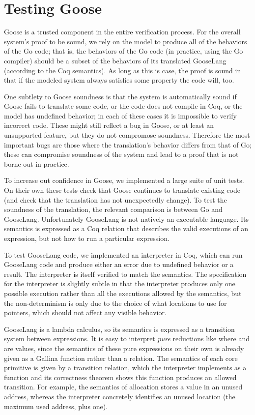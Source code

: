 \section{Testing Goose}
\label{sec:goose:testing}

Goose is a trusted component in the entire verification process. For the
overall system's proof to be sound, we rely on the model to produce all
of the behaviors of the Go code; that is, the behaviors of the Go code
(in practice, using the Go compiler) should be a subset of the behaviors
of its translated GooseLang (according to the Coq semantics). As long as
this is case, the proof is sound in that if the modeled system always
satisfies some property the code will, too.

One subtlety to Goose soundness is that the system is automatically sound if
Goose fails to translate some code, or the code does not compile in Coq, or the
model has undefined behavior; in each of these cases it is impossible to verify
incorrect code. These might still reflect a bug in Goose, or at least an
unsupported feature, but they do not compromose soundness. Therefore the
most important bugs are those where the translation's behavior differs
from that of Go; these can compromise soundness of the system and lead
to a proof that is not borne out in practice.

To increase out confidence in Goose, we implemented a large suite of
unit tests. On their own these tests check that Goose continues to translate
existing code (and check that the translation has not unexpectedly
change). To test the soundness of the translation, the relevant comparison is
between Go and GooseLang. Unfortunately GooseLang is not natively an executable language.
Its semantics is expressed as a Coq relation that describes the valid executions
of an expression, but not how to run a particular expression.

To test GooseLang code, we implemented an interpreter in Coq, which can
run GooseLang code and produce either an error due to undefined behavior
or a result. The interpreter is itself
verified to match the semantics. The specification for the interpreter is slightly
subtle in that the interpreter produces only one possible execution rather than
all the executions allowed by the semantics, but
the non-determinism is only due to the choice of what locations to use
for pointers, which should not affect any visible behavior.

GooseLang is a lambda calculus, so
its semantics is expressed as a transition system between expressions.
It is easy to
interpret \emph{pure} reductions like  where 
and  are values, since the semantics of these pure expressions on their own
is already given as a Gallina function rather than a relation. The semantics of each core primitive is
given by a transition relation, which the interpreter implements as a function
and its correctness theorem shows this function produces an allowed transition.
For example, the semantics of allocation stores a value in an unused address,
whereas the interpreter concretely identifies an unused location (the maximum
used address, plus one).

